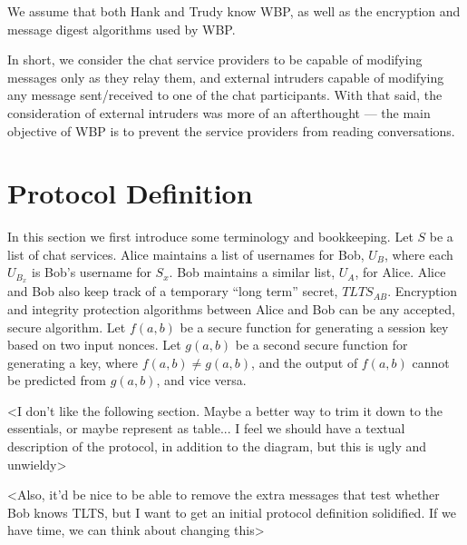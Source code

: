 \documentclass[twoside]{article}
\begin{document}
\begin{multicols}{2}
We assume that both Hank and Trudy know WBP, as well as the encryption and message digest algorithms used by WBP.

In short, we consider the chat service providers to be capable of modifying messages only as they relay them, and external intruders capable of modifying any message sent/received to one of the chat participants.  With that said, the consideration of external intruders was more of an afterthought --- the main objective of WBP is to prevent the service providers from reading conversations.

\section{Protocol Definition}
In this section we first introduce some terminology and bookkeeping.  Let $S$ be a list of chat services.  Alice maintains a list of usernames for Bob, $U_{B}$, where each $U_{B_x}$ is Bob's username for $S_x$.  Bob maintains a similar list, $U_{A}$, for Alice.  Alice and Bob also keep track of a temporary ``long term'' secret, $TLTS_{AB}$.  Encryption and integrity protection algorithms between Alice and Bob can be any accepted, secure algorithm.  Let $f(a,b)$ be a secure function for generating a session key based on two input nonces.  Let $g(a,b)$ be a second secure function for generating a key, where $f(a,b) \neq g(a,b)$, and the output of $f(a,b)$ cannot be predicted from $g(a,b)$, and vice versa.

<I don't like the following section.  Maybe a better way to trim it down to the essentials, or maybe represent as table...  I feel we should have a textual description of the protocol, in addition to the diagram, but this is ugly and unwieldy>

<Also, it'd be nice to be able to remove the extra messages that test whether Bob knows TLTS, but I want to get an initial protocol definition solidified.  If we have time, we can think about changing this>


\end{multicols}
\end{document}
